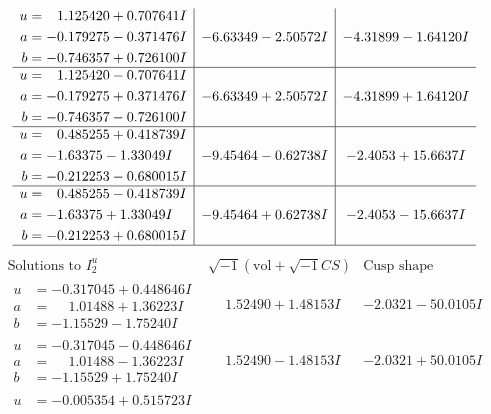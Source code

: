 \documentclass[1p]{elsarticle_modified}
\theoremstyle{definition}
\newcommand{\I}{\sqrt{-1}}
\begin{document}
$$\begin{array}{c|c|c}
\begin{aligned}
u &= \phantom{-}1.125420 + 0.707641 I \\
a &= -0.179275 - 0.371476 I \\
b &= -0.746357 + 0.726100 I\end{aligned}
 & -6.63349 - 2.50572 I & -4.31899 - 1.64120 I \\ \hline\begin{aligned}
u &= \phantom{-}1.125420 - 0.707641 I \\
a &= -0.179275 + 0.371476 I \\
b &= -0.746357 - 0.726100 I\end{aligned}
 & -6.63349 + 2.50572 I & -4.31899 + 1.64120 I \\ \hline\begin{aligned}
u &= \phantom{-}0.485255 + 0.418739 I \\
a &= -1.63375 - 1.33049 I \\
b &= -0.212253 - 0.680015 I\end{aligned}
 & -9.45464 - 0.62738 I & -2.4053 + 15.6637 I \\ \hline\begin{aligned}
u &= \phantom{-}0.485255 - 0.418739 I \\
a &= -1.63375 + 1.33049 I \\
b &= -0.212253 + 0.680015 I\end{aligned}
 & -9.45464 + 0.62738 I & -2.4053 - 15.6637 I\\
 \hline 
 \end{array}$$\newpage$$\begin{array}{c|c|c}  
\text{Solutions to }I^u_{2}& \I (\text{vol} + \sqrt{-1}CS) & \text{Cusp shape}\\
 \hline 
\begin{aligned}
u &= -0.317045 + 0.448646 I \\
a &= \phantom{-}1.01488 + 1.36223 I \\
b &= -1.15529 - 1.75240 I\end{aligned}
 & \phantom{-}1.52490 + 1.48153 I & -2.0321 - 50.0105 I \\ \hline\begin{aligned}
u &= -0.317045 - 0.448646 I \\
a &= \phantom{-}1.01488 - 1.36223 I \\
b &= -1.15529 + 1.75240 I\end{aligned}
 & \phantom{-}1.52490 - 1.48153 I & -2.0321 + 50.0105 I \\ \hline\begin{aligned}
u &= -0.005354 + 0.515723 I \\

\end{aligned}
\end{array}$$
\end{document}
